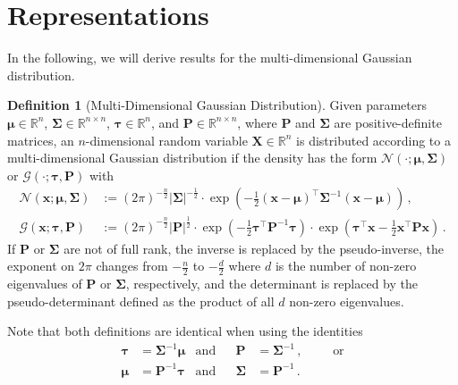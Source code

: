 \documentclass[a4paper]{article}
\newcommand{\Real}{{\mathbb R}}
\newcommand{\Normal}[3]{{\mathcal N} \left({#1};{#2},{#3}\right)}
\newcommand{\Gauss}[3]{{\mathcal G} \left({#1};{#2},{#3}\right)}
\newcommand{\bs}[1]{{\boldsymbol{#1}}}
\newcommand{\transpose}[1]{{#1}^\top}
\theoremstyle{definition}
\newtheorem{definition}{Definition}
\begin{document}
\section*{Representations}
In the following, we will derive results for the multi-dimensional Gaussian distribution.
\begin{definition}[Multi-Dimensional Gaussian Distribution]
    Given parameters $\bs{\mu} \in \Real^n$, $\bs{\Sigma} \in \Real^{n \times n}$, $\bs{\tau} \in \Real^n$, and $\bs{P} \in \Real^{n \times n}$, where $\bs{P}$ and $\bs{\Sigma}$ are positive-definite matrices, an $n$-dimensional random variable $\bs{X} \in \Real^n$ is distributed according to a multi-dimensional Gaussian distribution if the density has the form $\Normal{\cdot}{\bs{\mu}}{\boldsymbol{\Sigma}}$ or $\Gauss{\cdot}{\bs{\tau}}{\bs{P}}$ with
    \begin{align}
        \Normal{\bs{x}}{\bs{\mu}}{\bs{\Sigma}} & := \left(2\pi\right)^{-\frac{n}{2}} \left|\bs{\Sigma}\right|^{-\frac{1}{2}} \cdot \exp \left( -\frac{1}{2} \transpose{(\bs{x}-\bs{\mu})} \bs{\Sigma}^{-1} (\bs{x}-\bs{\mu}) \right) \,, \label{eq:Normal_definition} \\
        \Gauss{\bs{x}}{\bs{\tau}}{\bs{P}}      & := \left(2\pi\right)^{-\frac{n}{2}} \left|\bs{P}\right|^{\frac{1}{2}} \cdot \exp \left( -\frac{1}{2} \transpose{\bs{\tau}} \bs{P}^{-1} \bs{\tau} \right) \cdot \exp \left( \transpose{\bs{\tau}} \bs{x} -\frac{1}{2} \transpose{\bs{x}} \bs{P} \bs{x} \right)\,. \label{eq:Gauss_definition}
    \end{align}
    If $\bs{P}$ or $\bs{\Sigma}$ are not of full rank, the inverse is replaced by the pseudo-inverse, the exponent on $2\pi$ changes from $-\frac{n}{2}$ to $-\frac{d}{2}$ where $d$ is the number of non-zero eigenvalues of $\bs{P}$ or $\bs{\Sigma}$, respectively, and the determinant is replaced by the pseudo-determinant defined as the product of all $d$ non-zero eigenvalues.
\end{definition}
Note that both definitions are identical when using the identities
\begin{align}
    \bs{\tau} & = \bs{\Sigma}^{-1}\bs{\mu} & \mbox{and} &  & \bs{P}      & = \bs{\Sigma}^{-1} \,,                                       &  &  & \mbox{or} \label{eq:Normal_Gauss_transformation} \\
    \bs{\mu}  & = \bs{P}^{-1}\bs{\tau}     & \mbox{and} &  & \bs{\Sigma} & = \bs{P}^{-1} \,. \label{eq:Gauss_Normal_transformation}
\end{align}
\end{document}
